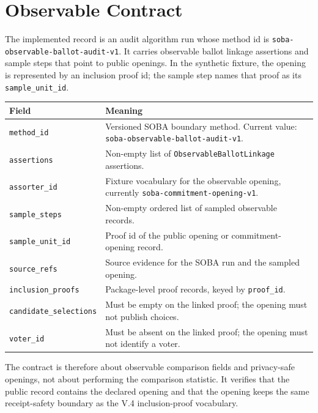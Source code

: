 \section{Observable Contract}

The implemented record is an audit algorithm run whose method id is
\texttt{soba-observable-ballot-audit-v1}. It carries observable ballot linkage
assertions and sample steps that point to public openings. In the synthetic
fixture, the opening is represented by an inclusion proof id; the sample step
names that proof as its \texttt{sample\_unit\_id}.

\begin{center}
\small
\begin{tabularx}{\textwidth}{lX}
\toprule
Field & Meaning \\
\midrule
\texttt{method\_id} & Versioned SOBA boundary method. Current value: \texttt{soba-observable-ballot-audit-v1}. \\
\texttt{assertions} & Non-empty list of \texttt{ObservableBallotLinkage} assertions. \\
\texttt{assorter\_id} & Fixture vocabulary for the observable opening, currently \texttt{soba-commitment-opening-v1}. \\
\texttt{sample\_steps} & Non-empty ordered list of sampled observable records. \\
\texttt{sample\_unit\_id} & Proof id of the public opening or commitment-opening record. \\
\texttt{source\_refs} & Source evidence for the SOBA run and the sampled opening. \\
\texttt{inclusion\_proofs} & Package-level proof records, keyed by \texttt{proof\_id}. \\
\texttt{candidate\_selections} & Must be empty on the linked proof; the opening must not publish choices. \\
\texttt{voter\_id} & Must be absent on the linked proof; the opening must not identify a voter. \\
\bottomrule
\end{tabularx}
\end{center}

The contract is therefore about observable comparison fields and privacy-safe
openings, not about performing the comparison statistic. It verifies that the
public record contains the declared opening and that the opening keeps the same
receipt-safety boundary as the V.4 inclusion-proof vocabulary.
